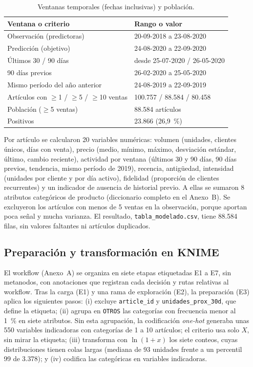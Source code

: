 \documentclass[
  journal=largetwo,
  manuscript=Laboratorio-Numero-02,
  year=2026,
  volume=1
]{cup-journal}
\begin{document}
\begin{table}[!ht]
\centering\footnotesize
\caption{Ventanas temporales (fechas inclusivas) y población.}
\label{tab:ventanas}
\begin{tabular}{@{}ll@{}}
\toprule
Ventana o criterio & Rango o valor \\
\midrule
Observación (predictoras) & 20-09-2018 a 23-08-2020 \\
Predicción (objetivo) & 24-08-2020 a 22-09-2020 \\
Últimos 30 / 90 días & desde 25-07-2020 / 26-05-2020 \\
90 días previos & 26-02-2020 a 25-05-2020 \\
Mismo período del año anterior & 24-08-2019 a 22-09-2019 \\
\midrule
Artículos con $\ge$1 / $\ge$5 / $\ge$10 ventas & 100.757 / 88.584 / 80.458 \\
Población ($\ge$5 ventas) & 88.584 artículos \\
Positivos & 23.866 (26,9~\%) \\
\bottomrule
\end{tabular}
\end{table}

Por artículo se calcularon 20 variables numéricas: volumen (unidades, clientes únicos, días con venta), precio (medio, mínimo, máximo, desviación estándar, último, cambio reciente), actividad por ventana (últimos 30 y 90 días, 90 días previos, tendencia, mismo período de 2019), recencia, antigüedad, intensidad (unidades por cliente y por día activo), fidelidad (proporción de clientes recurrentes) y un indicador de ausencia de historial previo. A ellas se sumaron 8 atributos categóricos de producto (diccionario completo en el Anexo~B). Se excluyeron los artículos con menos de 5 ventas en la observación, porque aportan poca señal y mucha varianza. El resultado, \texttt{tabla\_modelado.csv}, tiene 88.584 filas, sin valores faltantes ni artículos duplicados.

\subsection{Preparación y transformación en KNIME}

El workflow (Anexo~A) se organiza en siete etapas etiquetadas E1 a E7, sin metanodos, con anotaciones que registran cada decisión y rutas relativas al workflow. Tras la carga (E1) y una rama de exploración (E2), la preparación (E3) aplica los siguientes pasos:
(i) excluye \texttt{article\_id} y \texttt{unidades\_prox\_30d}, que define la etiqueta;
(ii) agrupa en \texttt{OTROS} las categorías con frecuencia menor al 1~\% en siete atributos. Sin esta agrupación, la codificación \textit{one-hot} generaba unas 550 variables indicadoras con categorías de 1 a 10 artículos; el criterio usa solo $X$, sin mirar la etiqueta;
(iii) transforma con $\ln(1+x)$ los siete conteos, cuyas distribuciones tienen colas largas (mediana de 93 unidades frente a un percentil 99 de 3.378); y
(iv) codifica las categóricas en variables indicadoras.
\end{document}
